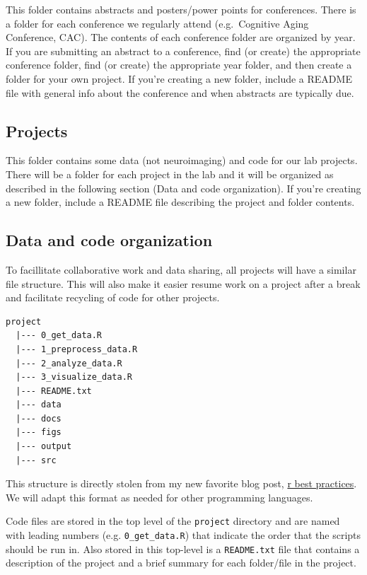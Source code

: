 \documentclass[]{book}
\begin{document}
This folder contains abstracts and posters/power points for conferences. There is a folder for each conference we regularly attend (e.g.~Cognitive Aging Conference, CAC). The contents of each conference folder are organized by year. If you are submitting an abstract to a conference, find (or create) the appropriate conference folder, find (or create) the appropriate year folder, and then create a folder for your own project. If you're creating a new folder, include a README file with general info about the conference and when abstracts are typically due.

\hypertarget{projects}{%
\subsection{Projects}\label{projects}}

This folder contains some data (not neuroimaging) and code for our lab projects. There will be a folder for each project in the lab and it will be organized as described in the following section (Data and code organization). If you're creating a new folder, include a README file describing the project and folder contents.

\hypertarget{data-and-code-organization}{%
\subsection{Data and code organization}\label{data-and-code-organization}}

To facillitate collaborative work and data sharing, all projects will have a similar file structure. This will also make it easier resume work on a project after a break and facilitate recycling of code for other projects.

\begin{verbatim}
project 
  |--- 0_get_data.R
  |--- 1_preprocess_data.R
  |--- 2_analyze_data.R
  |--- 3_visualize_data.R
  |--- README.txt
  |--- data
  |--- docs
  |--- figs
  |--- output
  |--- src
\end{verbatim}

This structure is directly stolen from my new favorite blog post, \href{https://kdestasio.github.io/post/r_best_practices/}{r best practices}. We will adapt this format as needed for other programming languages.

Code files are stored in the top level of the \texttt{project} directory and are named with leading numbers (e.g. \texttt{0\_get\_data.R}) that indicate the order that the scripts should be run in. Also stored in this top-level is a \texttt{README.txt} file that contains a description of the project and a brief summary for each folder/file in the project.
\end{document}
